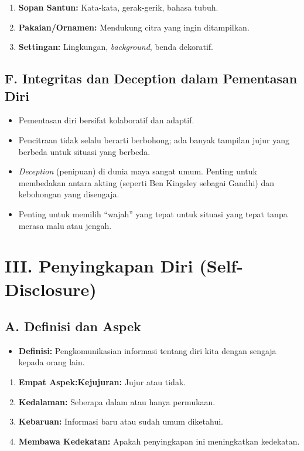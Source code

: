 \documentclass[
  letterpaper,
  DIV=11,
  numbers=noendperiod]{scrreprt}
\providecommand{\tightlist}{%
  \setlength{\itemsep}{0pt}\setlength{\parskip}{0pt}}
\begin{document}
\begin{enumerate}
\def\labelenumi{\arabic{enumi}.}
\tightlist
\item
  \textbf{Sopan Santun:} Kata-kata, gerak-gerik, bahasa tubuh.
\item
  \textbf{Pakaian/Ornamen:} Mendukung citra yang ingin ditampilkan.
\item
  \textbf{Settingan:} Lingkungan, \emph{background}, benda dekoratif.
\end{enumerate}

\subsection{F. Integritas dan Deception dalam Pementasan
Diri}\label{f.-integritas-dan-deception-dalam-pementasan-diri}

\begin{itemize}
\tightlist
\item
  Pementasan diri bersifat kolaboratif dan adaptif.
\item
  Pencitraan tidak selalu berarti berbohong; ada banyak tampilan jujur
  yang berbeda untuk situasi yang berbeda.
\item
  \emph{Deception} (penipuan) di dunia maya sangat umum. Penting untuk
  membedakan antara akting (seperti Ben Kingsley sebagai Gandhi) dan
  kebohongan yang disengaja.
\item
  Penting untuk memilih ``wajah'' yang tepat untuk situasi yang tepat
  tanpa merasa malu atau jengah.
\end{itemize}

\section{III. Penyingkapan Diri
(Self-Disclosure)}\label{iii.-penyingkapan-diri-self-disclosure}

\subsection{A. Definisi dan Aspek}\label{a.-definisi-dan-aspek}

\begin{itemize}
\tightlist
\item
  \textbf{Definisi:} Pengkomunikasian informasi tentang diri kita dengan
  sengaja kepada orang lain.
\end{itemize}

\begin{enumerate}
\def\labelenumi{\arabic{enumi}.}
\tightlist
\item
  \textbf{Empat Aspek:Kejujuran:} Jujur atau tidak.
\item
  \textbf{Kedalaman:} Seberapa dalam atau hanya permukaan.
\item
  \textbf{Kebaruan:} Informasi baru atau sudah umum diketahui.
\item
  \textbf{Membawa Kedekatan:} Apakah penyingkapan ini meningkatkan
  kedekatan.
\end{enumerate}
\end{document}
